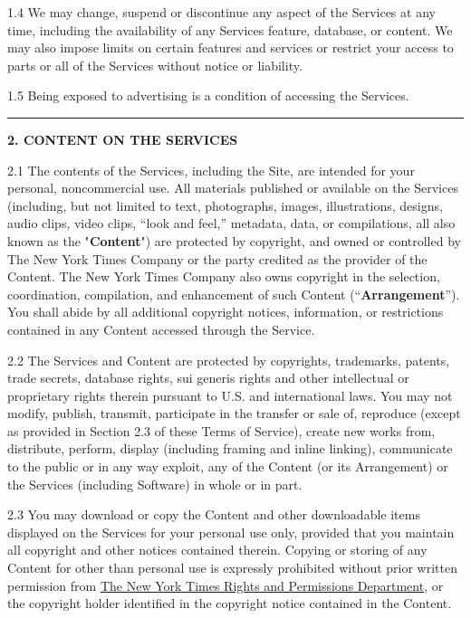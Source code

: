 1.4 We may change, suspend or discontinue any aspect of the Services at
any time, including the availability of any Services feature, database,
or content. We may also impose limits on certain features and services
or restrict your access to parts or all of the Services without notice
or liability.

1.5 Being exposed to advertising is a condition of accessing the
Services.

\begin{center}\rule{0.5\linewidth}{\linethickness}\end{center}

\textbf{2. CONTENT ON THE SERVICES}

2.1 The contents of the Services, including the Site, are intended for
your personal, noncommercial use. All materials published or available
on the Services (including, but not limited to text, photographs,
images, illustrations, designs, audio clips, video clips, ``look and
feel,'' metadata, data, or compilations, all also known as the
"\textbf{Content}") are protected by copyright, and owned or controlled
by The New York Times Company or the party credited as the provider of
the Content. The New York Times Company also owns copyright in the
selection, coordination, compilation, and enhancement of such Content
(``\textbf{Arrangement}''). You shall abide by all additional copyright
notices, information, or restrictions contained in any Content accessed
through the Service.

2.2 The Services and Content are protected by copyrights, trademarks,
patents, trade secrets, database rights, sui generis rights and other
intellectual or proprietary rights therein pursuant to U.S. and
international laws. You may not modify, publish, transmit, participate
in the transfer or sale of, reproduce (except as provided in Section 2.3
of these Terms of Service), create new works from, distribute, perform,
display (including framing and inline linking), communicate to the
public or in any way exploit, any of the Content (or its Arrangement) or
the Services (including Software) in whole or in part.

2.3 You may download or copy the Content and other downloadable items
displayed on the Services for your personal use only, provided that you
maintain all copyright and other notices contained therein. Copying or
storing of any Content for other than personal use is expressly
prohibited without prior written permission from
\href{http://www.nytimes3xbfgragh.onion/content/help/rights/permissions/permissions.html}{The
New York Times Rights and Permissions Department}, or the copyright
holder identified in the copyright notice contained in the Content.

